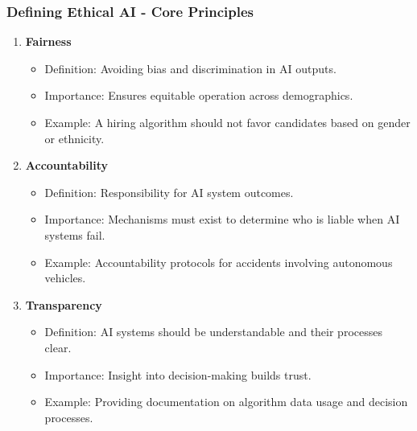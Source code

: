 \documentclass{beamer}
\begin{document}
\begin{frame}[fragile]
    \frametitle{Defining Ethical AI - Core Principles}
    \begin{enumerate}
        \item \textbf{Fairness}
            \begin{itemize}
                \item Definition: Avoiding bias and discrimination in AI outputs.
                \item Importance: Ensures equitable operation across demographics.
                \item Example: A hiring algorithm should not favor candidates based on gender or ethnicity.
            \end{itemize}
        \item \textbf{Accountability}
            \begin{itemize}
                \item Definition: Responsibility for AI system outcomes.
                \item Importance: Mechanisms must exist to determine who is liable when AI systems fail.
                \item Example: Accountability protocols for accidents involving autonomous vehicles.
            \end{itemize}
        \item \textbf{Transparency}
            \begin{itemize}
                \item Definition: AI systems should be understandable and their processes clear.
                \item Importance: Insight into decision-making builds trust.
                \item Example: Providing documentation on algorithm data usage and decision processes.
            \end{itemize}
    \end{enumerate}
\end{frame}
\end{document}
